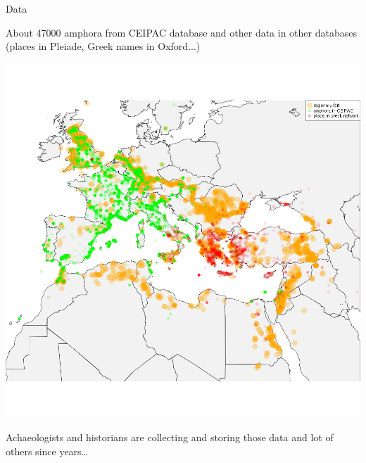 \documentclass[8pt, handout=show,notes=show]{beamer}
\begin{document}
\begin{frame}{Data}

	About 47000 amphora from CEIPAC database and other data in other databases (places in Pleiade, Greek names in Oxford...)

	\begin{center}
		\includegraphics[width=.9\textwidth]{images/fortGreekPlaceAndAmphora.png}
	\end{center}
	
	Achaeologists and historians are collecting and storing those data and lot of others since years\dots
\end{frame}
\end{document}
